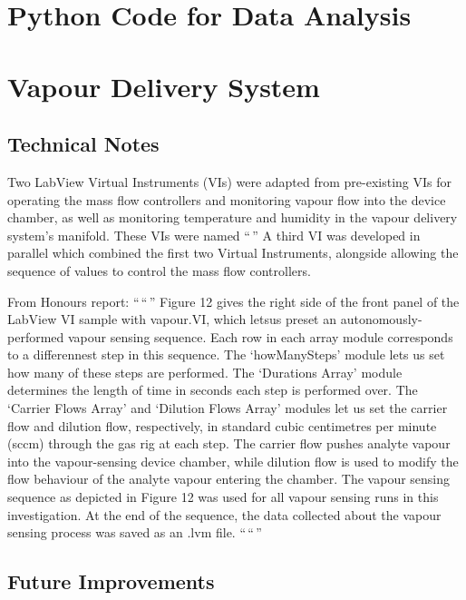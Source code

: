 \documentclass[
  a4paper,
]{scrbook}
\begin{document}
\hypertarget{sec-python}{%
\chapter{Python Code for Data Analysis}\label{sec-python}}

\hypertarget{vapour-delivery-system}{%
\chapter{Vapour Delivery System}\label{vapour-delivery-system}}

\hypertarget{technical-notes}{%
\section{Technical Notes}\label{technical-notes}}

Two LabView Virtual Instruments (VIs) were adapted from pre-existing VIs
for operating the mass flow controllers and monitoring vapour flow into
the device chamber, as well as monitoring temperature and humidity in
the vapour delivery system's manifold. These VIs were named ``\,'' A
third VI was developed in parallel which combined the first two Virtual
Instruments, alongside allowing the sequence of values to control the
mass flow controllers.

From Honours report: ``\,``\,'' Figure 12 gives the right side of the
front panel of the LabView VI sample with vapour.VI, which letsus preset
an autonomously-performed vapour sensing sequence. Each row in each
array module corresponds to a differennest step in this sequence. The
`howManySteps' module lets us set how many of these steps are performed.
The `Durations Array' module determines the length of time in seconds
each step is performed over. The `Carrier Flows Array' and `Dilution
Flows Array' modules let us set the carrier flow and dilution flow,
respectively, in standard cubic centimetres per minute (sccm) through
the gas rig at each step. The carrier flow pushes analyte vapour into
the vapour-sensing device chamber, while dilution flow is used to modify
the flow behaviour of the analyte vapour entering the chamber. The
vapour sensing sequence as depicted in Figure 12 was used for all vapour
sensing runs in this investigation. At the end of the sequence, the data
collected about the vapour sensing process was saved as an .lvm file.
``\,``\,''

\hypertarget{future-improvements}{%
\section{Future Improvements}\label{future-improvements}}


\backmatter
\printbibliography
\end{document}
